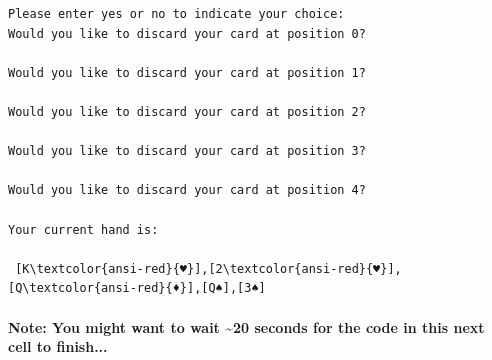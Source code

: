 \documentclass[11pt]{article}
\begin{document}
    \begin{Verbatim}[commandchars=\\\{\}]
Please enter yes or no to indicate your choice:
Would you like to discard your card at position 0? 

Would you like to discard your card at position 1? 

Would you like to discard your card at position 2? 

Would you like to discard your card at position 3? 

Would you like to discard your card at position 4? 

Your current hand is: 

 [K\textcolor{ansi-red}{♥}],[2\textcolor{ansi-red}{♥}],[Q\textcolor{ansi-red}{♦}],[Q♠],[3♠] 

    \end{Verbatim}

    \paragraph{Note: You might want to wait \textasciitilde{}20 seconds for
the code in this next cell to
finish...}\label{note-you-might-want-to-wait-20-seconds-for-the-code-in-this-next-cell-to-finish...}
\end{document}
